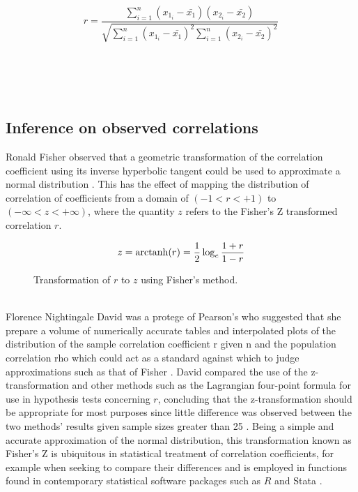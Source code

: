 $$r = \frac{\sum_{i=1}^{n} (x_{1}_{i} - \bar{x_1})(x_{2}_i - \bar{x_{2}})}{\sqrt{\sum_{i=1}^{n} (x_{1}_i - \bar{x_{1}})^2 \sum_{i=1}^{n} (x_{2}_i - \bar{x_{2}})^2}}$$
\\
\\
\\
\\
\subsection{Inference on observed correlations}
Ronald Fisher observed that a geometric transformation of the correlation coefficient using its inverse hyperbolic tangent could be used to approximate a normal distribution \cite{Fisher1915}.  This has the effect of mapping the distribution of correlation of coefficients from a domain of $(-1 < r < +1)$ to $(-\infty < z < +\infty)$, where the quantity $z$ refers to the Fisher's Z transformed correlation $r$. 

$$z = \operatorname{arctanh}(r) = \frac{1}{2} \log_e \frac{1+r}{1-r}$$

\begin{figure}[htbp]
\sidecaption[t]
{}
\caption{Transformation of $r$ to $z$ using Fisher's method.}
\label{fig:ztransform}       %
\end{figure}

\\

Florence Nightingale David was a protege of Pearson's who suggested that she prepare a volume of numerically accurate tables and interpolated plots of the distribution of the sample correlation coefficient r given n and the population correlation rho which could act as a standard against which to judge approximations such as that of Fisher \cite{David1938}.  David compared the use of the z-transformation and other methods such as the Lagrangian four-point formula for use in hypothesis tests concerning $r$, concluding that the z-transformation should be appropriate for most purposes since little difference was observed between the two methods' results given sample sizes greater than 25 \cite{David1938}.  Being a simple and accurate approximation of the normal distribution, this transformation known as Fisher's Z is ubiquitous in statistical treatment of correlation coefficients, for example when seeking to compare their differences and is employed in functions found in contemporary statistical software packages such as $R$ and Stata \cite{R2018,StataCorp2013}.

